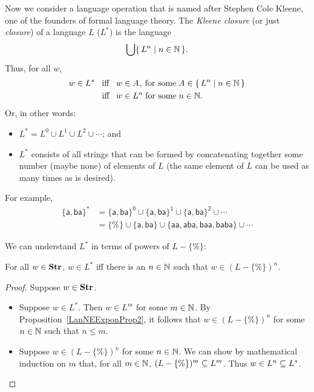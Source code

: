 Now we consider a language operation that is named after
Stephen Cole Kleene, one of the founders of formal language theory.
%
%
The \emph{Kleene closure} (or just \emph{closure}) of a language
$L$ ($L^*$) is the language
\begin{gather*}
\bigcup\{ \, L^n \mid n\in\mathbb{N} \, \}.
\end{gather*}
Thus, for all $w$,
\begin{align*}
w\in L^*&\mathrel{\;\;\allowbreak\mbox{iff}\allowbreak\;\;} w\in A,\;\allowbreak\mbox{for some}\allowbreak\;A\in\{ \, L^n \mid n\in\mathbb{N} \, \} \\
&\mathrel{\;\;\allowbreak\mbox{iff}\allowbreak\;\;} w\in L^n\;\allowbreak\mbox{for some}\allowbreak\;n\in\mathbb{N} .
\end{align*}
Or, in other words:
\begin{itemize}
\item $L^*=L^0\cup L^1\cup L^2\cup{\cdots}$; and

\item $L^*$ consists of all strings that can be formed by concatenating
together some number (maybe none) of elements of $L$ (the same element of
$L$ can be used as many times as is desired).
\end{itemize}
For example,
\begin{align*}
\mathsf{\{a,ba\}^*} &=
\mathsf{\{a,ba\}^0\cup\{a,ba\}^1\cup\{a,ba\}^2\cup\cdots} \\
&= \mathsf{\{\%\}\cup
   \{a,ba\}\cup
   \{aa,aba,baa,baba\}\cup\cdots}
\end{align*}

We can understand $L^*$ in terms of powers of $L - \{\%\}$:

\begin{proposition}
\label{LanExponNEChar1}
For all $w\in\mathbf{Str}$, $w\in L^*$ iff there is an $n\in\mathbb{N}$ such that
$w\in (L-\{\%\})^n$.
\end{proposition}

\begin{proof}
Suppose $w\in\mathbf{Str}$.
\begin{itemize}
\item Suppose $w\in L^*$. Then $w\in L^m$ for some $m\in\mathbb{N}$. By
  Proposition~\ref{LanNEExponProp2}, it follows that $w\in (L-\{\%\})^n$
  for some $n\in\mathbb{N}$ such that $n\leq m$.

\item Suppose $w\in (L-\{\%\})^n$ for some $n\in\mathbb{N}$. We can show by
  mathematical induction on $m$ that, for all $m\in\mathbb{N}$,
  $(L-\{\%\})^m\subseteq L^m$.  Thus $w\in L^n\subseteq L^*$.
\end{itemize}
\end{proof}

